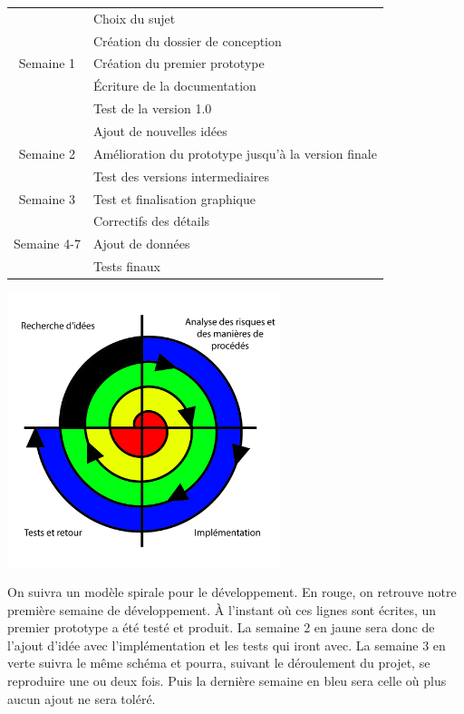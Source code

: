 \documentclass{article}
\begin{document}
\begin{tabular*}{1.0\textwidth}{@{\extracolsep{\fill}} | c | l | }
  \hline
  & Choix du sujet\\
  & Cr\'eation du dossier de conception\\
  Semaine 1 & Cr\'eation du premier prototype\\
  & \'Ecriture de la documentation\\
  & Test de la version 1.0\hspace*{7.6cm}\\
  \hline
  & Ajout de nouvelles id\'ees\\ 
  Semaine 2  & Am\'elioration du prototype jusqu'\`a la version finale\\
  & Test des versions intermediaires\\
  \hline
  Semaine 3  & Test et finalisation graphique\\
  \hline
  & Correctifs des d\'etails\\
  Semaine 4-7 & Ajout de donn\'ees\\
  & Tests finaux\\
  \hline
\end{tabular*}

\begin{center}
\includegraphics[width=0.6\textwidth]{spiral}\\
\end{center}

\hspace*{0.6cm}On suivra un mod\`ele spirale pour le d\'eveloppement. En rouge, on retrouve notre premi\`ere semaine de d\'eveloppement. \`A l'instant o\`u ces lignes sont \'ecrites, un premier prototype a \'et\'e test\'e et produit. La semaine 2 en jaune sera donc de l'ajout d'id\'ee avec l'impl\'ementation et les tests qui iront avec. La semaine 3 en verte suivra le m\^eme sch\'ema et pourra, suivant le d\'eroulement du projet, se reproduire une ou deux fois. Puis la derni\`ere semaine en bleu sera celle o\`u plus aucun ajout ne sera tol\'er\'e.
\end{document}
